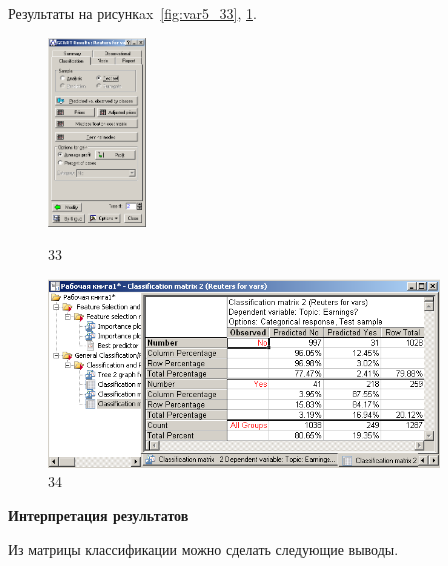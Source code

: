 Результаты на рисункax~\ref{fig:var5_33}, \ref{fig:var5_34}.

\begin{figure}[!h]
  \centering

  \begin{minipage}{0.29\textwidth}
    \centering

    \includegraphics[height=5cm]
    {inc/var5/33.PNG}

    \caption{33}

    \label{fig:var5_33}
  \end{minipage}
  \begin{minipage}{0.69\textwidth}
    \centering

    \includegraphics[height=5cm]
    {inc/var5/34.PNG}

    \caption{34}

    \label{fig:var5_34}
  \end{minipage}
\end{figure}

\newpage

\begin{center}
  \textbf{Интерпретация результатов}
\end{center}

Из матрицы классификации можно сделать следующие выводы.

